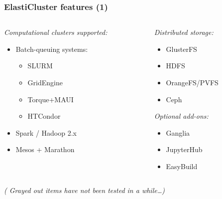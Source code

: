 \documentclass[english,serif,mathserif,usenames,dvipsnames]{beamer}
\begin{document}
\begin{frame}
  \frametitle{ElastiCluster features (1)}

  \begin{columns}
    \begin{column}{0.5\linewidth}
      \emph{Computational clusters supported:}
      \begin{itemize}
      \item Batch-queuing systems:
        \begin{itemize}
        \item SLURM
        \item GridEngine
        \item Torque+MAUI
        \item {\color{gray} HTCondor}
        \end{itemize}
      \item Spark / Hadoop 2.x
      \item {\color{gray} Mesos + Marathon}
      \end{itemize}
    \end{column}
    \begin{column}{0.5\linewidth}
      \emph{Distributed storage:}
      \begin{itemize}
      \item GlusterFS
      \item HDFS
      \item OrangeFS/PVFS
      \item {\color{gray} Ceph}
      \end{itemize}

      \+
      \emph{Optional add-ons:}
      \begin{itemize}
      \item Ganglia
      \item JupyterHub
      \item EasyBuild
      \end{itemize}
    \end{column}
  \end{columns}

  \+
  \begin{center}
    \footnotesize\em
    ({\color{gray} Grayed out} items have not been
    tested in a while\ldots)
  \end{center}
\end{frame}
\end{document}
